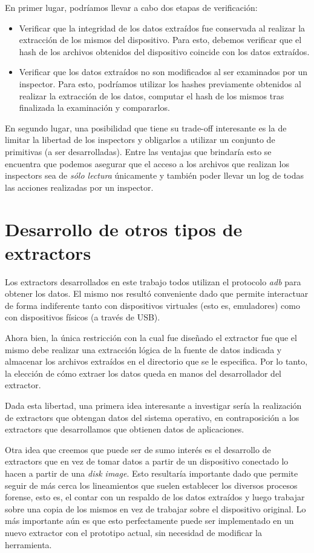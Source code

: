En primer lugar, podríamos llevar a cabo dos etapas de verificación:
\begin{itemize}
\item Verificar que la integridad de los datos extraídos fue conservada al realizar la extracción de los mismos del dispositivo. Para esto, debemos verificar que el hash de los archivos obtenidos del dispositivo coincide con los datos extraídos.
\item Verificar que los datos extraídos no son modificados al ser examinados por un inspector. Para esto, podríamos utilizar los hashes previamente obtenidos al realizar la extracción de los datos, computar el hash de los mismos tras finalizada la examinación y compararlos.
\end{itemize}

En segundo lugar, una posibilidad que tiene su trade-off interesante es la de limitar la libertad de los inspectors y obligarlos a utilizar un conjunto de primitivas (a ser desarrolladas). Entre las ventajas que brindaría esto se encuentra que podemos asegurar que el acceso a los archivos que realizan los inspectors sea de \emph{sólo lectura} únicamente y también poder llevar un log de todas las acciones realizadas por un inspector.

\section{Desarrollo de otros tipos de extractors} \label{OtrosTiposDeExtractors}
Los extractors desarrollados en este trabajo todos utilizan el protocolo \emph{adb} para obtener los datos. El mismo nos resultó conveniente dado que permite interactuar de forma indiferente tanto con dispositivos virtuales (esto es, emuladores) como con dispositivos físicos (a través de USB).

Ahora bien, la única restricción con la cual fue diseñado el extractor fue que el mismo debe realizar una extracción lógica de la fuente de datos indicada y almacenar los archivos extraídos en el directorio que se le especifica. Por lo tanto, la elección de cómo extraer los datos queda en manos del desarrollador del extractor.

Dada esta libertad, una primera idea interesante a investigar sería la realización de extractors que obtengan datos del sistema operativo, en contraposición a los extractors que desarrollamos que obtienen datos de aplicaciones.

Otra idea que creemos que puede ser de sumo interés es el desarrollo de extractors que en vez de tomar datos a partir de un dispositivo conectado lo hacen a partir de una \emph{disk image}. Esto resultaría importante dado que permite seguir de más cerca los lineamientos que suelen establecer los diversos procesos forense, esto es, el contar con un respaldo de los datos extraídos y luego trabajar sobre una copia de los mismos en vez de trabajar sobre el dispositivo original. Lo más importante aún es que esto perfectamente puede ser implementado en un nuevo extractor con el prototipo actual, sin necesidad de modificar la herramienta.

